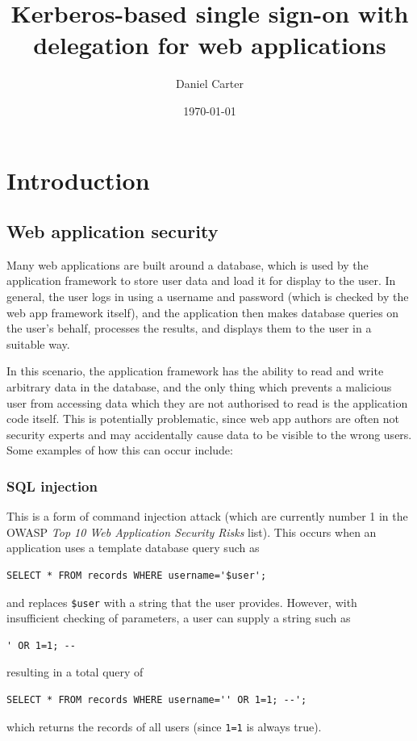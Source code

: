 \documentclass{article}
\title{Kerberos-based single sign-on with delegation for web applications}
\author{Daniel Carter}
\date {\today}
\begin{document}
\maketitle

\section{Introduction}

\subsection{Web application security}
Many web applications are built around a database, which is used by the application framework to store user data and load it for display to the user. In general, the user logs in using a username and password (which is checked by the web app framework itself), and the application then makes database queries on the user's behalf, processes the results, and displays them to the user in a suitable way.

In this scenario, the application framework has the ability to read and write arbitrary data in the database, and the only thing which prevents a malicious user from accessing data which they are not authorised to read is the application code itself. This is potentially problematic, since web app authors are often not security experts and may accidentally cause data to be visible to the wrong users. Some examples of how this can occur include:

\subsubsection{SQL injection}
This is a form of command injection attack (which are currently number 1 in the OWASP \textit{Top 10 Web Application Security Risks} list\cite{OWASP10}). This occurs when an application uses a template database query such as
\begin{verbatim}
SELECT * FROM records WHERE username='$user';
\end{verbatim}
and replaces \verb+$user+ with a string that the user provides. However, with insufficient checking of parameters, a user can supply a string such as
\begin{verbatim}
' OR 1=1; --
\end{verbatim}
resulting in a total query of
\begin{verbatim}
SELECT * FROM records WHERE username='' OR 1=1; --';
\end{verbatim}
which returns the records of all users (since \verb+1=1+ is always true).
\end{document}
